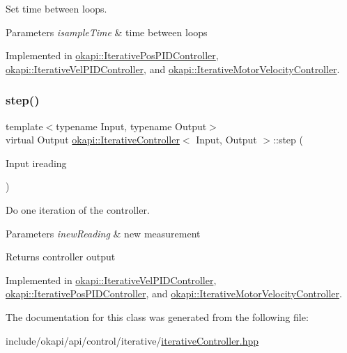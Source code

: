 Set time between loops.


\begin{DoxyParams}{Parameters}
{\em isample\+Time} & time between loops \\
\hline
\end{DoxyParams}


Implemented in \mbox{\hyperlink{classokapi_1_1IterativePosPIDController_a89e9f71510b9779282175fe3f5b071d6}{okapi\+::\+Iterative\+Pos\+P\+I\+D\+Controller}}, \mbox{\hyperlink{classokapi_1_1IterativeVelPIDController_aef5ba457e81871d47519413551856bb8}{okapi\+::\+Iterative\+Vel\+P\+I\+D\+Controller}}, and \mbox{\hyperlink{classokapi_1_1IterativeMotorVelocityController_ab94173452bbba03ffe51a4e700e2a870}{okapi\+::\+Iterative\+Motor\+Velocity\+Controller}}.

\mbox{\label{classokapi_1_1IterativeController_a751bcad1407099e629e3ffbe395daf2b}} 
\subsubsection{\texorpdfstring{step()}{step()}}
{\footnotesize\ttfamily template$<$typename Input, typename Output$>$ \\
virtual Output \mbox{\hyperlink{classokapi_1_1IterativeController}{okapi\+::\+Iterative\+Controller}}$<$ Input, Output $>$\+::step (\begin{DoxyParamCaption}\item[{Input}]{ireading }\end{DoxyParamCaption})\hspace{0.3cm}{\ttfamily [pure virtual]}}

Do one iteration of the controller.


\begin{DoxyParams}{Parameters}
{\em inew\+Reading} & new measurement \\
\hline
\end{DoxyParams}
\begin{DoxyReturn}{Returns}
controller output 
\end{DoxyReturn}


Implemented in \mbox{\hyperlink{classokapi_1_1IterativeVelPIDController_a7d75bb1622974daba25a9dec4df68325}{okapi\+::\+Iterative\+Vel\+P\+I\+D\+Controller}}, \mbox{\hyperlink{classokapi_1_1IterativePosPIDController_acec6d9ee4c41f78b54b6b28317bcd1e9}{okapi\+::\+Iterative\+Pos\+P\+I\+D\+Controller}}, and \mbox{\hyperlink{classokapi_1_1IterativeMotorVelocityController_a71f514d22293dc2e23de26ecd994d57c}{okapi\+::\+Iterative\+Motor\+Velocity\+Controller}}.



The documentation for this class was generated from the following file\+:\begin{DoxyCompactItemize}
\item 
include/okapi/api/control/iterative/\mbox{\hyperlink{iterativeController_8hpp}{iterative\+Controller.\+hpp}}\end{DoxyCompactItemize}
